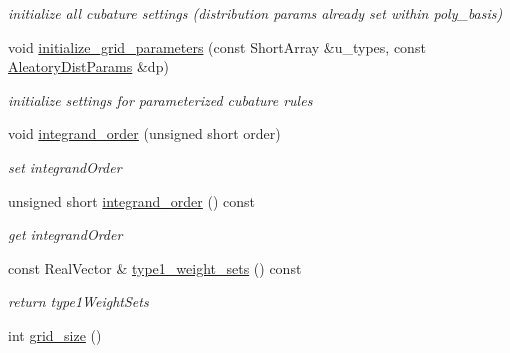 \begin{DoxyCompactItemize}
\begin{DoxyCompactList}\small\item\em initialize all cubature settings (distribution params already set within poly\+\_\+basis) \end{DoxyCompactList}\item 
void \hyperlink{classPecos_1_1CubatureDriver_a8ccb22f815295e0cbc3ef645af30ca02}{initialize\+\_\+grid\+\_\+parameters} (const Short\+Array \&u\+\_\+types, const \hyperlink{classPecos_1_1AleatoryDistParams}{Aleatory\+Dist\+Params} \&dp)\label{classPecos_1_1CubatureDriver_a8ccb22f815295e0cbc3ef645af30ca02}

\begin{DoxyCompactList}\small\item\em initialize settings for parameterized cubature rules \end{DoxyCompactList}\item 
void \hyperlink{classPecos_1_1CubatureDriver_afcf9a1f723bcb50caf73da3bb31362c4}{integrand\+\_\+order} (unsigned short order)\label{classPecos_1_1CubatureDriver_afcf9a1f723bcb50caf73da3bb31362c4}

\begin{DoxyCompactList}\small\item\em set integrand\+Order \end{DoxyCompactList}\item 
unsigned short \hyperlink{classPecos_1_1CubatureDriver_a22765dd74a676125244e482f9a6c2f9f}{integrand\+\_\+order} () const \label{classPecos_1_1CubatureDriver_a22765dd74a676125244e482f9a6c2f9f}

\begin{DoxyCompactList}\small\item\em get integrand\+Order \end{DoxyCompactList}\item 
const Real\+Vector \& \hyperlink{classPecos_1_1CubatureDriver_ae858d8bd4c244a98b0ff43c979b65e69}{type1\+\_\+weight\+\_\+sets} () const \label{classPecos_1_1CubatureDriver_ae858d8bd4c244a98b0ff43c979b65e69}

\begin{DoxyCompactList}\small\item\em return type1\+Weight\+Sets \end{DoxyCompactList}\item 
int \hyperlink{classPecos_1_1CubatureDriver_a4b04c73f01f5eb9e6171305141eb1f73}{grid\+\_\+size} ()\label{classPecos_1_1CubatureDriver_a4b04c73f01f5eb9e6171305141eb1f73}


\end{DoxyCompactItemize}
